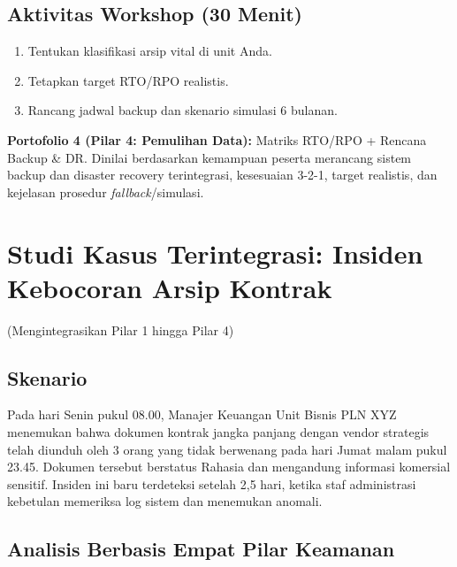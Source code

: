 \documentclass[12pt,a4paper]{report}
\begin{document}

\section{Aktivitas Workshop (30 Menit)}
\begin{enumerate}[leftmargin=*]
    \item Tentukan klasifikasi arsip vital di unit Anda.
    \item Tetapkan target RTO/RPO realistis.
    \item Rancang jadwal backup dan skenario simulasi 6 bulanan.
\end{enumerate}

\begin{outputbox}
\textbf{Portofolio 4 (Pilar 4: Pemulihan Data):} Matriks RTO/RPO + Rencana Backup \& DR. Dinilai berdasarkan kemampuan peserta merancang sistem backup dan disaster recovery terintegrasi, kesesuaian 3-2-1, target realistis, dan kejelasan prosedur \textit{fallback}/simulasi.
\end{outputbox}

\chapter{Studi Kasus Terintegrasi: Insiden Kebocoran Arsip Kontrak}
(Mengintegrasikan Pilar 1 hingga Pilar 4)


\section{Skenario}
Pada hari Senin pukul 08.00, Manajer Keuangan Unit Bisnis PLN XYZ menemukan bahwa dokumen kontrak jangka panjang dengan vendor strategis telah diunduh oleh 3 orang yang tidak berwenang pada hari Jumat malam pukul 23.45. Dokumen tersebut berstatus Rahasia dan mengandung informasi komersial sensitif. Insiden ini baru terdeteksi setelah 2,5 hari, ketika staf administrasi kebetulan memeriksa log sistem dan menemukan anomali.


\section{Analisis Berbasis Empat Pilar Keamanan}
\end{document}
